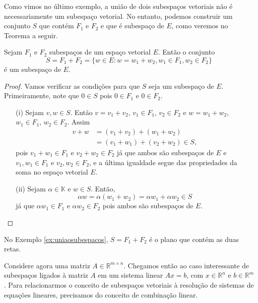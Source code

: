 Como vimos no último exemplo, a união de dois subespaços vetoriais não é necessariamente um subespaço vetorial. No entanto, podemos construir um conjunto $S$ que contém $F_1$ e $F_2$ e que é subespaço de $E$, como veremos no Teorema a seguir.

\begin{teo}
  Sejam $F_1$ e $F_2$ subespaços de um espaço vetorial $E$. Então o conjunto
  \begin{equation*}
    S = F_1+F_2 = \{ w \in E : w = w_1+w_2, w_1\in F_1, w_2\in F_2\}
  \end{equation*}
  é um subespaço de $E$.
\end{teo}
\begin{proof}
Vamos verificar as condições para que $S$ seja um subespaço de $E$. Primeiramente, note que $0\in S$ pois $0 \in F_1$ e $0\in F_2$. 
\begin{itemize}
\item[(i)] Sejam $v, w \in S$. Então $v = v_1+v_2$, $v_1 \in F_1$, $v_2 \in F_2$ e $w = w_1+w_2$, $w_1 \in F_1$, $w_2 \in F_2$. Assim
  \begin{align*}
    v+w &= (v_1+v_2)+(w_1+w_2)\\
    &= (v_1+w_1) + (v_2+w_2) \in S,
  \end{align*}
  pois $v_1+w_1 \in F_1$ e $v_2+w_2 \in F_2$ já que ambos são subespaços de $E$ e $v_1,w_1 \in F_1$ e $v_2,w_2 \in F_2$, e a última igualdade segue das propriedades da soma no espaço vetorial $E$.
\item[(ii)] Sejam $\alpha \in {\mathbb{K}}$ e $w \in S$. Então,
  \begin{equation*}
    \alpha w = \alpha (w_1+w_2) = \alpha w_1 + \alpha w_2 \in S
  \end{equation*}
  já que $\alpha w_1 \in F_1$ e $\alpha w_2 \in F_2$ pois ambos são subespaços de $E$.
\end{itemize}
\end{proof}

\begin{exemplo}
  No Exemplo \ref{ex:uniaosubespacos}, $S = F_1+F_2$ é o plano que contém as duas retas.
\end{exemplo}

Considere agora uma matriz $A\in {\mathbb{R}}^{m\times n}$. Chegamos então ao caso interessante de subespaços ligados à matriz $A$ em um sistema linear $Ax=b$, com $x\in {\mathbb{R}}^n$ e $b\in {\mathbb{R}}^m$. Para relacionarmos o conceito de subespaços vetoriais à resolução de sistemas de equações lineares, precisamos do conceito de combinação linear.

